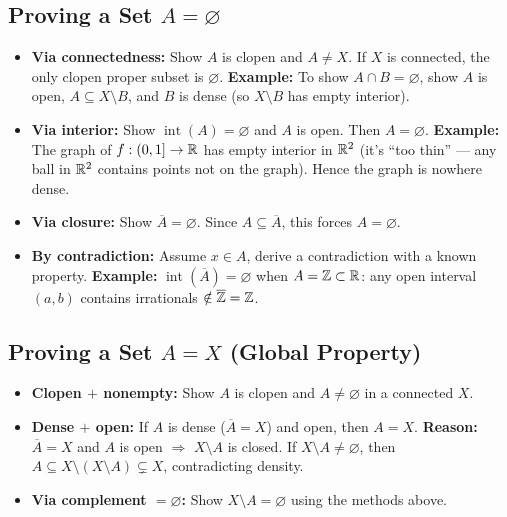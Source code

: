 \documentclass{article}
\begin{document}
\subsection{Proving a Set $A = \varnothing$}
\begin{itemize}
  \item \textbf{Via connectedness:} Show $A$ is clopen and $A \ne X$.
    If $X$ is connected, the only clopen proper subset is $\varnothing$.
    \textbf{Example:} To show $A \cap B = \varnothing$, show $A$ is
    open, $A \subseteq X \setminus B$, and $B$ is dense (so $X \setminus
    B$ has empty interior).

  \item \textbf{Via interior:} Show $\operatorname{int}(A) = \varnothing$
    and $A$ is open. Then $A = \varnothing$.
    \textbf{Example:} The graph of $f : (0,1] \to \mathbb{R}$ has empty interior
    in $\mathbb{R}^2$ (it's ``too thin'' --- any ball in $\mathbb{R}^2$ contains points
    not on the graph). Hence the graph is nowhere dense.

  \item \textbf{Via closure:} Show $\overline{A} = \varnothing$. Since
    $A \subseteq \overline{A}$, this forces $A = \varnothing$.

  \item \textbf{By contradiction:} Assume $x \in A$, derive a
    contradiction with a known property.
    \textbf{Example:} $\operatorname{int}(\overline{A}) = \varnothing$
    when $A = \mathbb{Z} \subset \mathbb{R}$: any open interval $(a,b)$ contains
    irrationals $\notin \overline{\mathbb{Z}} = \mathbb{Z}$.
\end{itemize}

\subsection{Proving a Set $A = X$ (Global Property)}
\begin{itemize}
  \item \textbf{Clopen $+$ nonempty:} Show $A$ is clopen and $A \ne
    \varnothing$ in a connected $X$.
  \item \textbf{Dense $+$ open:} If $A$ is dense ($\overline{A} = X$)
    and open, then $A = X$. \textbf{Reason:} $\overline{A} = X$ and $A$
    is open $\Rightarrow$ $X \setminus A$ is closed. If $X \setminus A
    \ne \varnothing$, then $A \subseteq X \setminus (X \setminus A)
    \subsetneq X$, contradicting density.
  \item \textbf{Via complement $= \varnothing$:} Show $X \setminus A =
    \varnothing$ using the methods above.
\end{itemize}
\end{document}
